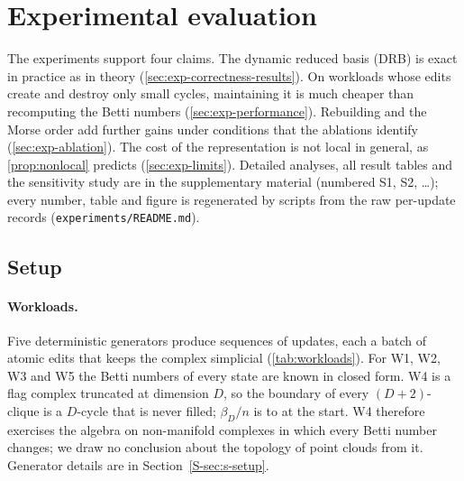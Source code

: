 \section{Experimental evaluation}\label{sec:experiments}

The experiments support four claims. The dynamic reduced basis (DRB) is exact
in practice as in theory (\cref{sec:exp-correctness-results}). On workloads
whose edits create and destroy only small cycles, maintaining it is much cheaper
than recomputing the Betti numbers (\cref{sec:exp-performance}). Rebuilding and
the Morse order add further gains under conditions that the ablations identify
(\cref{sec:exp-ablation}). The cost of the representation is not local in
general, as \cref{prop:nonlocal} predicts (\cref{sec:exp-limits}). Detailed
analyses, all result tables and the sensitivity study are in the supplementary
material (numbered S1, S2, \dots); every number, table and figure is regenerated by scripts from the
raw per-update records (\texttt{experiments/README.md}).

\subsection{Setup}\label{sec:exp-setup}

\paragraph{Workloads.}\label{sec:exp-workloads}
Five deterministic generators produce sequences of updates, each a batch of
atomic edits that keeps the complex simplicial (\cref{tab:workloads}). For W1,
W2, W3 and W5 the Betti numbers of every state are known in closed form. W4 is
a flag complex truncated at dimension $D$, so the boundary of every
$(D+2)$-clique is a $D$-cycle that is never filled; $\beta_D/n$ is
\NumWFourBetaDRatioMin{} to \NumWFourBetaDRatioMax{} at the start. W4 therefore
exercises the algebra on non-manifold complexes in which every Betti number
changes; we draw no conclusion about the topology of point clouds from it.
Generator details are in Section~\ref{S-sec:s-setup}.

